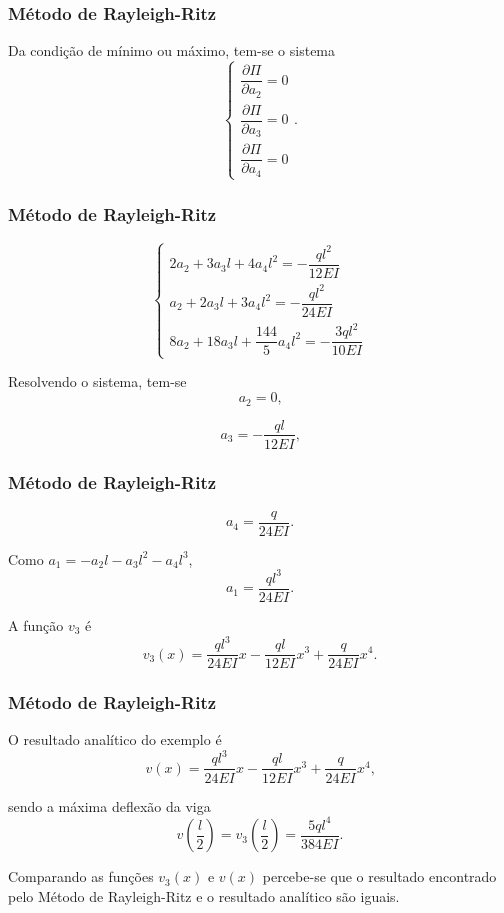 \documentclass{beamer}
\newif\ifcompilepause
\newcommand{\cpause}{
	\ifcompilepause
	\pause
	\fi
}
\begin{document}
	\begin{frame}
		\frametitle{Método de Rayleigh-Ritz}
		\justify
		Da condição de mínimo ou máximo, tem-se o sistema
		$$
			\begin{cases}
				\dfrac{\partial \Pi}{\partial a_2}=0\\[10pt]
				\dfrac{\partial \Pi}{\partial a_3}=0\\[10pt]
				\dfrac{\partial \Pi}{\partial a_4}=0
			\end{cases}
			\text{.}
		$$
	\end{frame}
	
	\begin{frame}
		\frametitle{Método de Rayleigh-Ritz}
		\justify
		
		$$
			\begin{cases}
				2a_2 + 3a_3l + 4a_4l^2 = -\dfrac{ql^2}{12EI}\\[10pt]
				a_2 + 2a_3 l + 3a_4 l^2 = - \dfrac{ql^2}{24EI}\\[10pt]
				8a_2 + 18a_3 l + \dfrac{144}{5} a_4 l^2 =-\dfrac{3ql^2}{10EI}
			\end{cases}
		$$
		\cpause
		Resolvendo o sistema, tem-se
		$$
			a_2 = 0
			\text{,}
		$$
		\cpause
		$$
			a_3 = -\frac{ql}{12EI}
			\text{,}
		$$
	\end{frame}
	
	\begin{frame}
		\frametitle{Método de Rayleigh-Ritz}
		\justify
	
		$$
			a_4 = \frac{q}{24EI}
			\text{.}
		$$
		\cpause
		Como $a_1=-a_2l - a_3l^2-a_4l^3$,
		$$
			a_1 = \frac{ql^3}{24EI}
			\text{.}
		$$
		\cpause
		A função $v_3$ é
		$$
			v_3(x)=
			\frac{ql^3}{24EI} x
			-
			\frac{ql}{12EI} x^3
			+
			\frac{q}{24EI} x^4
			\text{.}
		$$
	\end{frame}
	
	\begin{frame}
		\frametitle{Método de Rayleigh-Ritz}
		\justify
		
		O resultado analítico do exemplo é
		$$
			v(x)=\frac{ql^3}{24EI}x - \frac{ql}{12EI}x^3 + \frac{q}{24EI}x^4
			\text{,}
		$$
		\cpause
		sendo a máxima deflexão da viga
		$$
			v\left (\frac{l}{2}\right )
			=
			v_3\left (\frac{l}{2}\right )
			= \frac{5ql^4}{384EI}
			\text{.}
		$$
		\cpause
		
		Comparando as funções $v_3(x)$ e $v(x)$ percebe-se que o resultado encontrado pelo Método de Rayleigh-Ritz e o resultado analítico são iguais.
	\end{frame}
	
\end{document}
